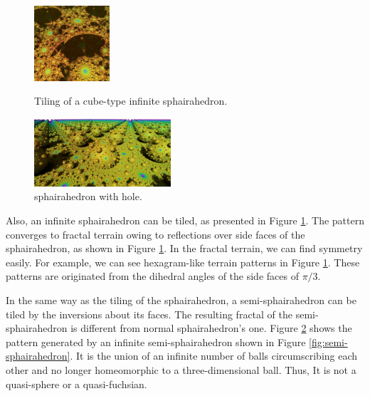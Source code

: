 \documentclass[suppldata, dvipdfmx]{interact}
\theoremstyle{plain}%
\theoremstyle{definition}
\theoremstyle{remark}
\theoremstyle{problemstyle}
\begin{document}
\begin{figure}[h!tbp]
 \hspace*{\fill}
 \begin{minipage}[t]{0.18\textwidth}
  \centering
  \includegraphics[height=1.1in, keepaspectratio]{./img/constructFractal/terrainProcess/final.jpg}
  \label{fig:sphairaPrismFinal}
 \end{minipage}
 \caption{Tiling of a cube-type infinite sphairahedron.}
 \label{fig:sphairahedralPrismTile}
\end{figure}

\begin{figure}[h!tbp]
  \centering
 \includegraphics[width=2in,
 keepaspectratio]{./img/constructFractal/semi-terrain2.png}
 \caption{sphairahedron with hole.}
  \label{fig:semiSphairaSpheres}
\end{figure}

Also, an infinite sphairahedron can be tiled, as presented in Figure
\ref{fig:sphairahedralPrismTile}.
The pattern converges to fractal terrain owing to reflections over side
faces of the sphairahedron, as shown in Figure 
\ref{fig:sphairahedralPrismTile}.
In the fractal terrain, we can find symmetry easily.
For example, we can see hexagram-like terrain patterns in Figure
\ref{fig:sphairahedralPrismTile}.
These patterns are originated from the dihedral angles of the side faces of
$\pi / 3$.

In the same way as the tiling of the sphairahedron, a semi-sphairahedron
can be tiled by the inversions about its faces.
The resulting fractal of the semi-sphairahedron is different from normal
sphairahedron's one.
Figure \ref{fig:semiSphairaSpheres} shows the pattern
generated by an infinite semi-sphairahedron shown in Figure 
\ref{fig:semi-sphairahedron}.
It is the union of an infinite number of balls
circumscribing each other and no longer homeomorphic
to a three-dimensional ball.
Thus, It is not a quasi-sphere or a quasi-fuchsian.
\end{document}

